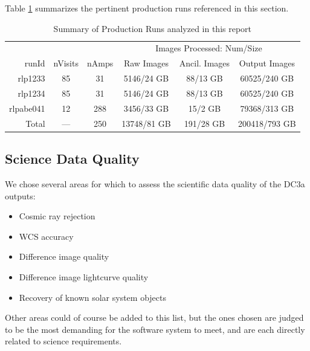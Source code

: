 Table \ref{tbl:runsummary} summarizes the pertinent production runs
referenced in this section.

\begin{table}[hp]
\centering
\caption{Summary of Production Runs analyzed in this report
\label{tbl:runsummary}}
\vspace{\baselineskip}
\begin{tabular}{rccccc}
\hline\hline
          &         &       & \multicolumn{3}{c}{Images Processed: Num/Size} \\
runId     & nVisits & nAmps & Raw Images & Ancil. Images & Output Images \\ \hline
rlp1233   & 85      & 31  & 5146/24 GB    & 88/13 GB       & 60525/240 GB \\ 
rlp1234   & 85      & 31  & 5146/24 GB    & 88/13 GB       & 60525/240 GB \\ 
rlpabe041 & 12      & 288 & 3456/33 GB    & 15/2 GB        & 79368/313 GB \\ \hline
Total     & ---     & 250 & 13748/81 GB   & 191/28 GB      & 200418/793 GB \\ \hline
\end{tabular}
\end{table}


\subsection{Science Data Quality}
We chose several areas for which to assess the scientific data quality of the DC3a outputs:
\begin{itemize}
\item Cosmic ray rejection
\item WCS accuracy
\item Difference image quality
\item Difference image lightcurve quality
\item Recovery of known solar system objects
\end{itemize}
Other areas could of course be added to this list, but the ones chosen
are judged to be the most demanding for the software system to meet,
and are each directly related to science requirements. 

